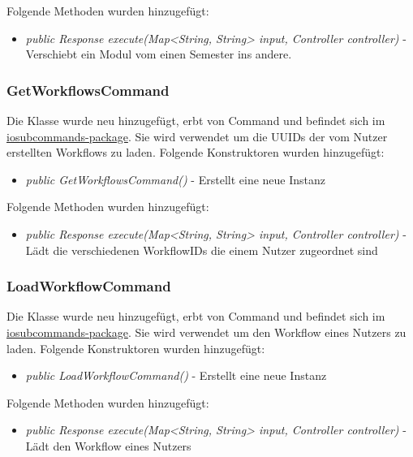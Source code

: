 \documentclass[parskip=full]{scrartcl}
\begin{document}
			 Folgende Methoden wurden hinzugefügt:
			 \begin{itemize}
			 	\item \textit{public Response execute(Map<String, String> input, Controller controller)} - Verschiebt ein Modul vom einen Semester ins andere.
			 	
			 \end{itemize}
			
		
	
				

			\subsubsection{GetWorkflowsCommand}
			Die Klasse wurde neu hinzugefügt, erbt von Command und befindet sich im  \hyperlink{controller:controller.commands.iosubcommands}{iosubcommands-package}. Sie wird verwendet um die UUIDs der vom Nutzer erstellten Workflows zu laden. 
			Folgende Konstruktoren wurden hinzugefügt:
			\begin{itemize}
				\item \textit{public GetWorkflowsCommand()} - Erstellt eine neue Instanz				
			\end{itemize}
			
			Folgende Methoden wurden hinzugefügt:
			\begin{itemize}
				\item \textit{public Response execute(Map<String, String> input, Controller controller)} - Lädt die verschiedenen WorkflowIDs die einem Nutzer zugeordnet sind
				
			\end{itemize}
			
			\subsubsection{LoadWorkflowCommand}
			Die Klasse wurde neu hinzugefügt, erbt von Command und befindet sich im  \hyperlink{controller:controller.commands.iosubcommands}{iosubcommands-package}. Sie wird verwendet um den Workflow eines Nutzers zu laden.
			Folgende Konstruktoren wurden hinzugefügt:
			\begin{itemize}
				\item \textit{public LoadWorkflowCommand()} - Erstellt eine neue Instanz				
			\end{itemize}
			
			Folgende Methoden wurden hinzugefügt:
			\begin{itemize}
				\item \textit{public Response execute(Map<String, String> input, Controller controller)} - Lädt den Workflow eines Nutzers				
			\end{itemize}
		
\end{document}
